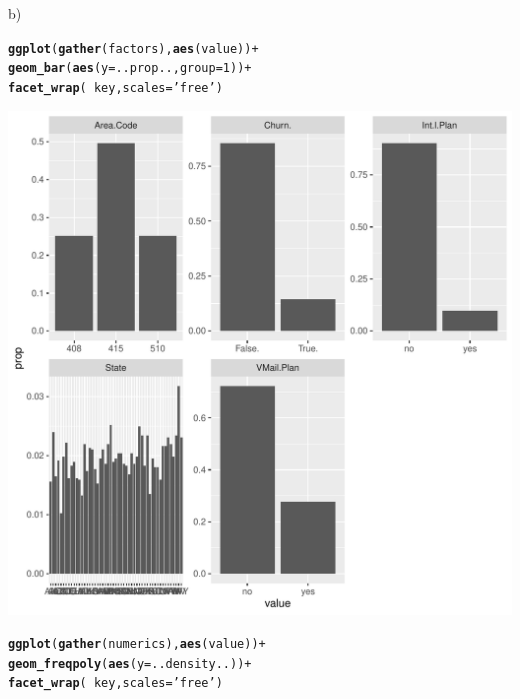 \documentclass{article}\usepackage[]{graphicx}\usepackage[]{color}
\makeatletter
\def\maxwidth{ %
  \ifdim\Gin@nat@width>\linewidth
    \linewidth
  \else
    \Gin@nat@width
  \fi
}
\newcommand{\hlnum}[1]{\textcolor[rgb]{0.686,0.059,0.569}{#1}}%
\newcommand{\hlstr}[1]{\textcolor[rgb]{0.192,0.494,0.8}{#1}}%
\newcommand{\hlopt}[1]{\textcolor[rgb]{0,0,0}{#1}}%
\newcommand{\hlstd}[1]{\textcolor[rgb]{0.345,0.345,0.345}{#1}}%
\newcommand{\hlkwc}[1]{\textcolor[rgb]{0.333,0.667,0.333}{#1}}%
\newcommand{\hlkwd}[1]{\textcolor[rgb]{0.737,0.353,0.396}{\textbf{#1}}}%
\newenvironment{kframe}{%
 \def\at@end@of@kframe{}%
 \ifinner\ifhmode%
  \def\at@end@of@kframe{\end{minipage}}%
  \begin{minipage}{\columnwidth}%
 \fi\fi%
 \def\FrameCommand##1{\hskip\@totalleftmargin \hskip-\fboxsep
 \colorbox{shadecolor}{##1}\hskip-\fboxsep
     \hskip-\linewidth \hskip-\@totalleftmargin \hskip\columnwidth}%
 \MakeFramed {\advance\hsize-\width
   \@totalleftmargin\z@ \linewidth\hsize
   \@setminipage}}%
 {\par\unskip\endMakeFramed%
 \at@end@of@kframe}
\newenvironment{knitrout}{}{} %
\makeatother
\begin{document}
\begin{description}
\item{b)}

\begin{knitrout}
\color{fgcolor}\begin{kframe}
\begin{alltt}
\hlkwd{ggplot}\hlstd{(}\hlkwd{gather}\hlstd{(factors),} \hlkwd{aes}\hlstd{(value))} \hlopt{+}
  \hlkwd{geom_bar}\hlstd{(}\hlkwd{aes}\hlstd{(}\hlkwc{y}\hlstd{=..prop..,} \hlkwc{group}\hlstd{=}\hlnum{1}\hlstd{))} \hlopt{+}
  \hlkwd{facet_wrap}\hlstd{(}\hlopt{~}\hlstd{key,} \hlkwc{scales}\hlstd{=}\hlstr{'free'}\hlstd{)}
\end{alltt}
\end{kframe}
\includegraphics[width=\maxwidth]{figure/Overviews_plots-1} 
\begin{kframe}\begin{alltt}
\hlkwd{ggplot}\hlstd{(}\hlkwd{gather}\hlstd{(numerics),} \hlkwd{aes}\hlstd{(value))} \hlopt{+}
  \hlkwd{geom_freqpoly}\hlstd{(}\hlkwd{aes}\hlstd{(}\hlkwc{y}\hlstd{=..density..))} \hlopt{+}
  \hlkwd{facet_wrap}\hlstd{(}\hlopt{~}\hlstd{key,} \hlkwc{scales}\hlstd{=}\hlstr{'free'}\hlstd{)}
\end{alltt}
\end{kframe}

\end{knitrout}
\end{description}
\end{document}
